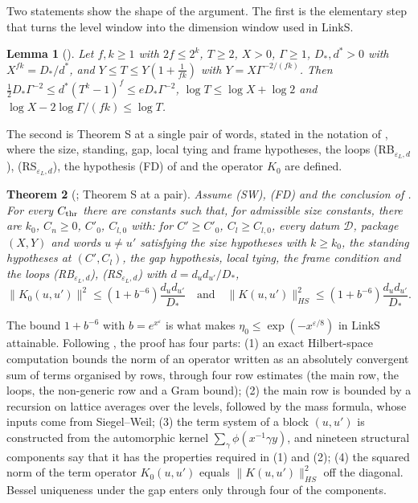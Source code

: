 \documentclass[10pt]{amsart}
\newtheorem{theorem}{Theorem}[section]
\newtheorem{lemma}[theorem]{Lemma}
\theoremstyle{definition}
\theoremstyle{remark}
\begin{document}
Two statements show the shape of the argument. The first is the
elementary step that turns the level window into the dimension window used
in $\mathrm{LinkS}$.

\begin{lemma}[{\cite[Lemma~\ref{A-i3:lem-power}]{Annex}}]\label{inp:lem-power}
Let $f,k\ge1$ with $2f\le2^k$, $T\ge2$, $X>0$, $\Gamma\ge1$, $D_*,d^*>0$ with
$X^{fk}=D_*/d^*$, and $Y\le T\le Y(1+\frac1{fk})$ with $Y=X\Gamma^{-2/(fk)}$.
Then $\frac12D_*\Gamma^{-2}\le d^*(T^k-1)^f\le eD_*\Gamma^{-2}$,
$\log T\le\log X+\log2$ and $\log X-2\log\Gamma/(fk)\le\log T$.
\end{lemma}

\noindent The second is Theorem S at a single pair of words, stated in
the notation of \cite[\S\ref{A-i3:ssec-S}]{Annex}, where the size, standing,
gap, local tying and frame hypotheses, the loops
(RB$_{\varepsilon_L,d}$), (RS$_{\varepsilon_L,d}$), the hypothesis (FD) of
\cite[Lemma~\ref{A-i3:S-lem-FD}]{Annex} and the operator $K_0$ are defined.

\begin{theorem}[{\cite[Theorem~\ref{A-i3:S-thm-pair}]{Annex}}; Theorem S at a pair]\label{inp:thm-Spair}
Assume (SW), (FD) and the conclusion of \cite[Proposition~\ref{A-i3:S-prop-NG}]{Annex}.  For every $C_{\rm thr}$ there are constants
such that, for admissible size constants, there are $k_0$, $C_n\ge0$, $C'_0$, $C_{l,0}$ with: for $C'\ge C'_0$,
$C_l\ge C_{l,0}$, every datum $\mathcal D$, package $(X,Y)$ and words $u\ne u'$ satisfying the size hypotheses with
$k\ge k_0$, the standing hypotheses at $(C',C_l)$, the gap hypothesis, local tying, the frame condition and the
loops (RB$_{\varepsilon_L,d}$), (RS$_{\varepsilon_L,d}$) with $d=d_ud_{u'}/D_*$,
\[
\|K_0(u,u')\|^2\le(1+b^{-6})\frac{d_ud_{u'}}{D_*}\quad\text{and}\quad\|K(u,u')\|_{HS}^2\le(1+b^{-6})\frac{d_ud_{u'}}{D_*}.
\]
\end{theorem}

\noindent The bound $1+b^{-6}$ with $b=e^{x^\varepsilon}$ is what makes
$\eta_0\le\exp(-x^{\varepsilon/8})$ in $\mathrm{LinkS}$ attainable. Following \cite[\S\ref{A-i3:S-ssec-proof}]{Annex}, the proof
has four parts: (1) an exact Hilbert-space computation bounds the norm of an
operator written as an absolutely convergent sum of terms organised by
rows, through four row estimates (the main row, the loops, the
non-generic row and a Gram bound); (2) the main row is bounded by a
recursion on lattice averages over the levels, followed by the mass
formula, whose inputs come from Siegel--Weil; (3) the term system of a block
$(u,u')$ is constructed from the automorphic kernel
$\sum_\gamma\phi(x^{-1}\gamma y)$, and nineteen structural components say
that it has the properties required in (1) and (2); (4) the squared norm of
the term operator $K_0(u,u')$ equals $\|K(u,u')\|_{HS}^2$ off the diagonal.
Bessel uniqueness under the gap enters only through four of the
components.
\end{document}
